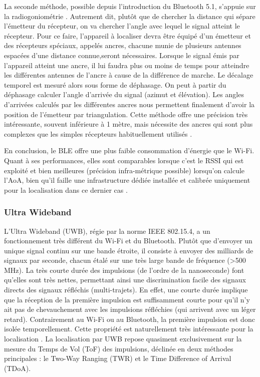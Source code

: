 \documentclass[11pt, a4paper]{article}
\begin{document}
La seconde méthode, possible depuis l’introduction du Bluetooth 5.1, s’appuie sur la radiogoniométrie \cite{woolleyBluetoothDirectionFinding}. Autrement dit, plutôt que de chercher la distance qui sépare l’émetteur du récepteur, on va chercher l’angle avec lequel le signal atteint le récepteur. Pour ce faire, l’appareil à localiser devra être équipé d’un émetteur et des récepteurs spéciaux, appelés ancres, chacune munie de plusieurs antennes espacées d’une distance connue,seront nécessaires. Lorsque le signal émis par l’appareil atteint une ancre, il lui faudra plus ou moins de temps pour atteindre les différentes antennes de l’ancre à cause de la différence de marche. Le décalage temporel est mesuré alors sous forme de déphasage. On peut à partir du déphasage calculer l’angle d’arrivée du signal (azimut et élévation). Les angles d’arrivées calculés par les différentes ancres nous permettent finalement d’avoir la position de l’émetteur par triangulation. Cette méthode offre une précision très intéressante, souvent inférieure à 1 mètre, mais nécessite des ancres qui sont plus complexes que les simples récepteurs habituellement utilisés \cite{milanoBLEBasedIndoorLocalization2024}.

En conclusion, le BLE offre une plus faible consommation d’énergie que le Wi-Fi. Quant à ses performances, elles sont comparables lorsque c’est le RSSI qui est exploité et bien meilleures (précision infra-métrique possible) lorsqu’on calcule l’AoA, bien qu’il faille une infrastructure dédiée installée et calibrée uniquement pour la localisation dans ce dernier cas \cite{milanoBLEBasedIndoorLocalization2024}.

\subsubsection{Ultra Wideband}

L’Ultra Wideband (UWB), régie par la norme IEEE 802.15.4, a un fonctionnement très différent du Wi-Fi et du Bluetooth. Plutôt que d’envoyer un unique signal continu sur une bande étroite, il consiste à envoyer des milliards de signaux par seconde, chacun étalé sur une très large bande de fréquence (>500 MHz). La très courte durée des impulsions (de l’ordre de la nanoseconde) font qu’elles sont très nettes, permettant ainsi une discrimination facile des signaux directs des signaux réfléchis (multi-trajets). En effet, une courte durée implique que la réception de la première impulsion est suffisamment courte pour qu’il n’y ait pas de chevauchement avec les impulsions réfléchies (qui arrivent avec un léger retard). Contrairement au Wi-Fi ou au Bluetooth, la première impulsion est donc isolée temporellement. Cette propriété est naturellement très intéressante pour la localisation \cite{dardariRangingUltrawideBandwidth2009}. La localisation par UWB repose quasiment exclusivement sur la mesure du Temps de Vol (ToF) des impulsions, déclinée en deux méthodes principales : le Two-Way Ranging (TWR) et le Time Difference of Arrival (TDoA).
\end{document}
